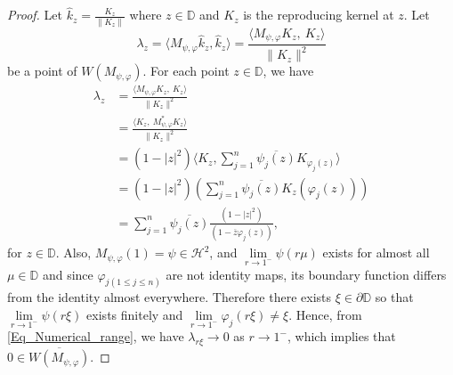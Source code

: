 \documentclass[12pt, reqno]{amsart}
\theoremstyle{definition}
\theoremstyle{remark}
\numberwithin{equation}{section}
\begin{document}
\begin{proof}
Let $\widehat{k}_z=\frac{K_z}{\|K_z\|}$ where $z\in \mathbb{D}$ and $K_z$ is the reproducing kernel at $z$. Let $$\lambda_z=\langle M_{\psi, \varphi}\widehat{k}_z, \widehat{k}_z \rangle=\frac{\langle M_{\psi, \varphi} K_z,~ K_z\rangle }{\|K_z\|^2}$$ be a point of $W(M_{\psi, \varphi})$. For each point $z\in \mathbb{D}$, we have
\begin{align}\label{Eq_Numerical_range}
\lambda_z&=\frac{\langle M_{\psi, \varphi} K_z,~ K_z\rangle }{\|K_z\|^2}\nonumber\\
&=\frac{\langle  K_z,~ M_{\psi, \varphi}^*K_z\rangle }{\|K_z\|^2}\nonumber\\
&=(1-|z|^2)\langle K_z, \sum_{j=1}^{n}\overline{\psi_j(z)}K_{\varphi_j(z)}\rangle\nonumber\\
&=(1-|z|^2)\left(\sum_{j=1}^{n}\overline{\psi_j(z)}K_z(\varphi_j(z))\right)\nonumber\\
&=\sum_{j=1}^{n}\overline{\psi_j(z)}\frac{(1-|z|^2)}{(1-\overline{z}\varphi_j(z))},
\end{align}
for $z\in \mathbb{D}$. 
 Also, $M_{\psi, \varphi}(1)=\psi\in \mathcal{H}^2$, and $\lim\limits_{r\rightarrow 1^-}\psi(r\mu)$ exists for almost all $\mu \in \mathbb{D}$ and 
 since $\varphi_{j{(1\leq j\leq n)}}$ are not identity maps, its boundary function differs from the identity almost everywhere. Therefore there exists $\xi \in \partial\mathbb{D}$ so that $\lim\limits_{r\rightarrow 1^-}\psi(r\xi)$ exists finitely and $\lim\limits_{r\rightarrow 1^-}\varphi_j(r\xi)\neq \xi$. Hence, from \eqref{Eq_Numerical_range}, we have $\lambda_{r\xi}\rightarrow 0$ as $r\rightarrow 1^-$, which implies that $0\in \overline{W(M_{\psi, \varphi})}$. 
\end{proof}
\end{document}
